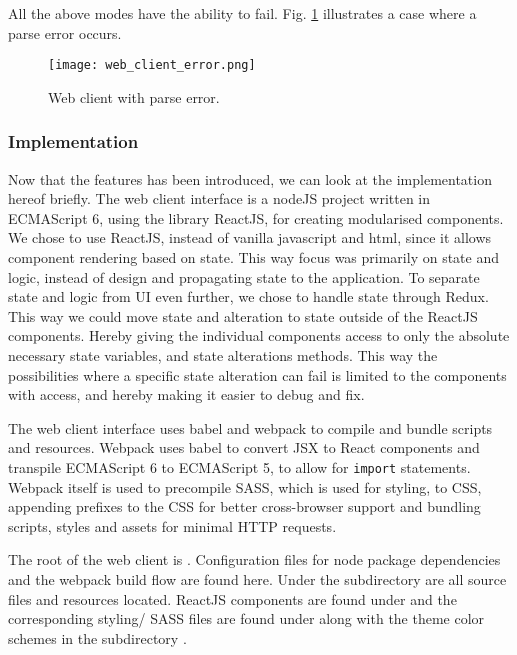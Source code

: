 All the above modes have the ability to fail. Fig. \ref{fig:web_client_error} illustrates a case where a parse error occurs.

\begin{figure}
  \texttt{[image: web\_client\_error.png]}
  \caption{Web client with parse error.}
  \label{fig:web_client_error}
\end{figure}


\subsubsection{Implementation}

Now that the features has been introduced, we can look at the implementation hereof briefly.
The web client interface is a nodeJS project written in ECMAScript 6, using the library ReactJS, for creating modularised components.
We chose to use ReactJS, instead of vanilla javascript and html, since it allows component rendering based on state.
This way focus was primarily on state and logic, instead of design and propagating state to the application.
To separate state and logic from UI even further, we chose to handle state through Redux.
This way we could move state and alteration to state outside of the ReactJS components. Hereby giving the individual components access to only the absolute necessary state variables, and state alterations methods.
This way the possibilities where a specific state alteration can fail is limited to the components with access, and hereby making it easier to debug and fix.

The web client interface uses babel and webpack to compile and bundle scripts and resources.
Webpack uses babel to convert JSX to React components and transpile ECMAScript 6 to ECMAScript 5, to allow for \texttt{import} statements.
Webpack itself is used to precompile SASS, which is used for styling, to CSS, appending prefixes to the CSS for better cross-browser support and bundling scripts, styles and assets for minimal HTTP requests.

The root of the web client is . Configuration files for node package dependencies and the webpack build flow are found here.
Under the subdirectory  are all source files and resources located.
ReactJS components are found under  and the corresponding styling/ SASS files are found under  along with the theme color schemes in the subdirectory .


